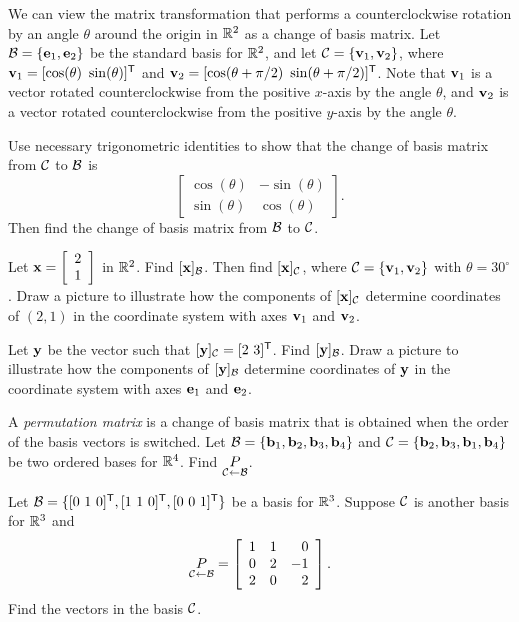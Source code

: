 \item We can view the matrix transformation that performs a counterclockwise rotation by an angle $\theta$ around the origin in $\mathbb{R}^2$ as a change of basis matrix. Let $\mathcal{B} = \{\mathbf{e}_1, \mathbf{e}_2\}$ be the standard basis for $\mathbb{R}^2$, and let $\mathcal{C} = \{\mathbf{v}_1, \mathbf{v}_2\}$, where $\mathbf{v}_1 = [\cos(\theta) \ \sin(\theta)]^{\mathsf{T}}$ and $\vv_2 = [\cos(\theta+\pi/2) \ \sin(\theta+ \pi/2)]^{\tr}$. Note that $\mathbf{v}_1$ is a vector rotated counterclockwise from the positive $x$-axis by the angle $\theta$, and $\mathbf{v}_2$ is a vector rotated counterclockwise from the positive $y$-axis by the angle $\theta$. 
\ba
\item Use necessary trigonometric identities to show that the change of basis matrix from $\mathcal{C}$ to $\mathcal{B}$ is 
\[\left[ \begin{array}{cr} \cos(\theta) & - \sin(\theta) \\ \sin(\theta) & \cos(\theta) \end{array} \right].\]
Then find the change of basis matrix from $\mathcal{B}$ to $\mathcal{C}$. 

\item Let $\mathbf{x} = \left[ \begin{array}{c} 2\\1 \end{array} \right]$ in $\mathbb{R}^2$. Find $[\mathbf{x}]_{\mathcal{B}}$. Then find $[\mathbf{x}]_{\mathcal{C}}$, where $\mathcal{C} = \{\mathbf{v}_1, \mathbf{v}_2\}$ with $\theta = 30^{\circ}$. Draw a picture to illustrate how the components of $[\mathbf{x}]_{\mathcal{C}}$ determine coordinates of $(2,1)$ in the coordinate system with axes $\mathbf{v}_1$ and $\mathbf{v}_2$. 

\item Let $\mathbf{y}$ be the vector such that $[\mathbf{y}]_{\mathcal{C}}  = [2 \ 3]^{\mathsf{T}}$. Find $[\mathbf{y}]_{\mathcal{B}}$. Draw a picture to illustrate how the components of $[\mathbf{y}]_{\mathcal{B}}$ determine coordinates of $\mathbf{y}$ in the coordinate system with axes $\mathbf{e}_1$ and $\mathbf{e}_2$. 

\ea


\item A \emph{permutation matrix} is a change of basis matrix that is obtained when the order of the basis vectors is switched. Let $\mathcal{B} = \{\mathbf{b}_1, \mathbf{b}_2, \mathbf{b}_3, \mathbf{b}_4\}$ and $\mathcal{C} = \{\mathbf{b}_2, \mathbf{b}_3, \mathbf{b}_1, \mathbf{b}_4\}$ be two ordered bases for $\mathbb{R}^4$. Find $\underset{\mathcal{C} \leftarrow \mathcal{B}}{P}$.


\item Let $\CB = \{[0 \ 1\ 0]^{\tr},[1 \ 1 \ 0]^{\tr}, [0 \ 0 \ 1]^{\tr}\}$ be a basis for $\mathbb{R}^3$. Suppose $\mathcal{C}$ is another basis for $\mathbb{R}^3$ and
\[\underset{\mathcal{C} \leftarrow \mathcal{B}}{P} = \left[ \begin{array}{ccr} 1&1&0 \\ 0&2&-1 \\ 2&0&2 \end{array} \right].\]
Find the vectors in the basis $\mathcal{C}$. 

